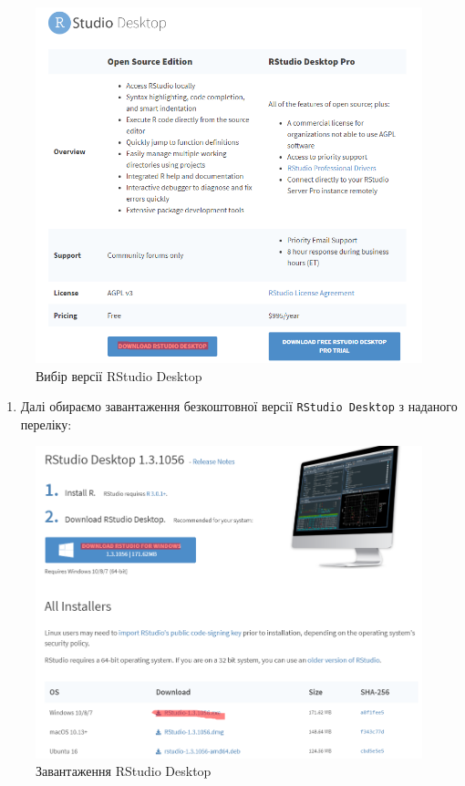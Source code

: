 \documentclass[
]{book}
\providecommand{\tightlist}{%
  \setlength{\itemsep}{0pt}\setlength{\parskip}{0pt}}
\begin{document}
\begin{figure}
\centering
\includegraphics{images/chapter1/rstudio_1.png}
\caption{\label{fig:unnamed-chunk-13}Вибір версії RStudio Desktop}
\end{figure}

\begin{enumerate}
\def\labelenumi{\arabic{enumi}.}
\setcounter{enumi}{2}
\tightlist
\item
  Далі обираємо завантаження безкоштовної версії \texttt{RStudio\ Desktop} з наданого переліку:
\end{enumerate}

\begin{figure}
\centering
\includegraphics{images/chapter1/rstudio_2.png}
\caption{\label{fig:unnamed-chunk-14}Завантаження RStudio Desktop}
\end{figure}
\end{document}
